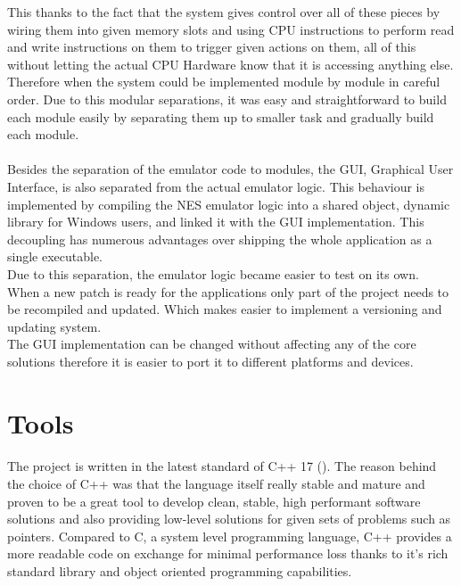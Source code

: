 \documentclass[]{report}
\begin{document}
This thanks to the fact that the system gives control over all of these pieces by wiring them into given memory slots and using CPU instructions to perform read and write instructions on them to trigger given actions on them, all of this without letting the actual CPU Hardware know that it is accessing anything else. Therefore when the system could be implemented module by module in careful order. Due to this modular separations, it was easy and straightforward to build each module easily by separating them up to smaller task and gradually build each module.
\paragraph{ }
Besides the separation of the emulator code to modules, the GUI, Graphical User Interface,  is also separated from the actual emulator logic. This behaviour is implemented by compiling the NES emulator logic into a shared object, dynamic library for Windows users, and linked it with the GUI implementation. This decoupling has numerous advantages over shipping the whole application as a single executable.
\\ 
Due to this separation, the emulator logic became easier to test on its own. 
\\ 
When a new patch is ready for the applications only part of the project needs to be recompiled and updated. Which makes easier to implement a versioning and updating system.
\\ 
The GUI implementation can be changed without affecting any of the core solutions therefore it is easier to port it to different platforms and devices.

\section{Tools}
\paragraph{ }
The project is written in the latest standard of C++ 17 (\cite{CPPV}). The reason behind the choice of C++ was that the language itself really stable and mature and proven to be a great tool to develop clean, stable, high performant software solutions and also providing low-level solutions for given sets of problems such as pointers. Compared to C, a system level programming language, C++ provides a more readable code on exchange for minimal performance loss thanks to it's rich standard library and object oriented programming capabilities.
\end{document}
